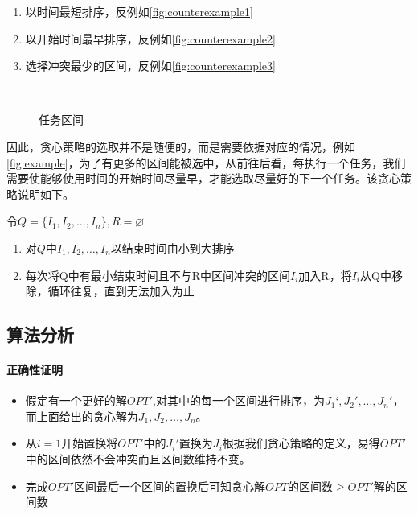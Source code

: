 \begin{enumerate}
	\item 以时间最短排序，反例如\autoref{fig:counterexample1}
	\item 以开始时间最早排序，反例如\autoref{fig:counterexample2}
	\item 选择冲突最少的区间，反例如\autoref{fig:counterexample3}
\end{enumerate}


\\
\begin{figure}[hbt!]
		\centering
	\caption{任务区间}\label{fig:example}
\end{figure}
\newpage
因此，贪心策略的选取并不是随便的，而是需要依据对应的情况，例如\autoref{fig:example}，为了有更多的区间能被选中，从前往后看，每执行一个任务，我们需要使能够使用时间的开始时间尽量早，才能选取尽量好的下一个任务。该贪心策略说明如下。

令$Q=\{I_1, I_2, \ldots, I_n\},R=\varnothing$

\begin{enumerate}
    \item 对$Q$中$I_1, I_2, \ldots, I_n$以结束时间由小到大排序
    \item 每次将Q中有最小结束时间且不与R中区间冲突的区间$I_i$加入R，将$I_i$从Q中移除，循环往复，直到无法加入为止
\end{enumerate}

\subsection{算法分析}
\paragraph*{正确性证明}
\begin{itemize}
    \item 假定有一个更好的解$OPT'$,对其中的每一个区间进行排序，为$J_1‘,J_2',\ldots,J_n'$，而上面给出的贪心解为$J_1,J_2,\ldots,J_n$。
    \item 从$i=1$开始置换将$OPT'$中的$J_i'置换为J_i$根据我们贪心策略的定义，易得$OPT'$中的区间依然不会冲突而且区间数维持不变。
    \item 完成$OPT'$区间最后一个区间的置换后可知贪心解$OPT$的区间数$\geq OPT'$解的区间数
\end{itemize}

